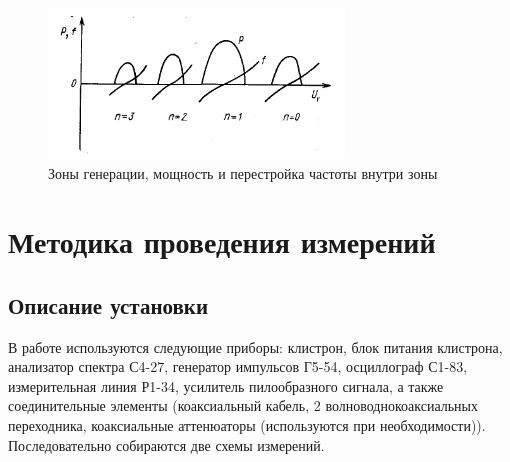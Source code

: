 \documentclass[a4paper,14pt]{extarticle}
\begin{document}
	\begin{figure}[h]
		\center
		\includegraphics[width = 0.7\textwidth]{images/zones.png}
		\caption{Зоны генерации, мощность и перестройка частоты внутри зоны}
		\label{figz}
	\end{figure}

	\section{Методика проведения измерений}
	\subsection{Описание установки}
	В работе используются следующие приборы: клистрон, блок питания клистрона, анализатор спектра С4-27, генератор импульсов Г5-54, осциллограф С1-83, измерительная линия Р1-34, усилитель пилообразного сигнала, а также соединительные элементы (коаксиальный кабель, 2 волноводно\-коаксиальных переходника, коаксиальные аттенюаторы (используются при необходимости)). Последовательно собираются две схемы измерений.
	
\end{document}
